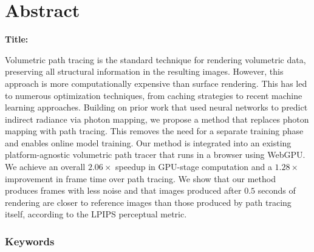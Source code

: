{}
\chapter*{Abstract}

\noindent\textbf{Title:} \ttitleEn
\bigskip

Volumetric path tracing is the standard technique for rendering volumetric data,
preserving all structural information in the resulting images. However, this
approach is more computationally expensive than surface rendering. This has led
to numerous optimization techniques, from caching strategies to recent machine
learning approaches. Building on prior work that used neural networks to predict
indirect radiance via photon mapping, we propose a method that replaces photon
mapping with path tracing. This removes the need for a separate training phase
and enables online model training. Our method is integrated into an existing
platform-agnostic volumetric path tracer that runs in a browser using WebGPU. We
achieve an overall $2.06\times$ speedup in GPU-stage computation and a
$1.28\times$ improvement in frame time over path tracing. We show that our method
produces frames with less noise and that images produced after $0.5$ seconds of
rendering are closer to reference images than those produced by path tracing 
itself, according to the LPIPS perceptual metric.

\subsection*{Keywords}
\textit{\tkeywordsEn}
\clearemptydoublepage